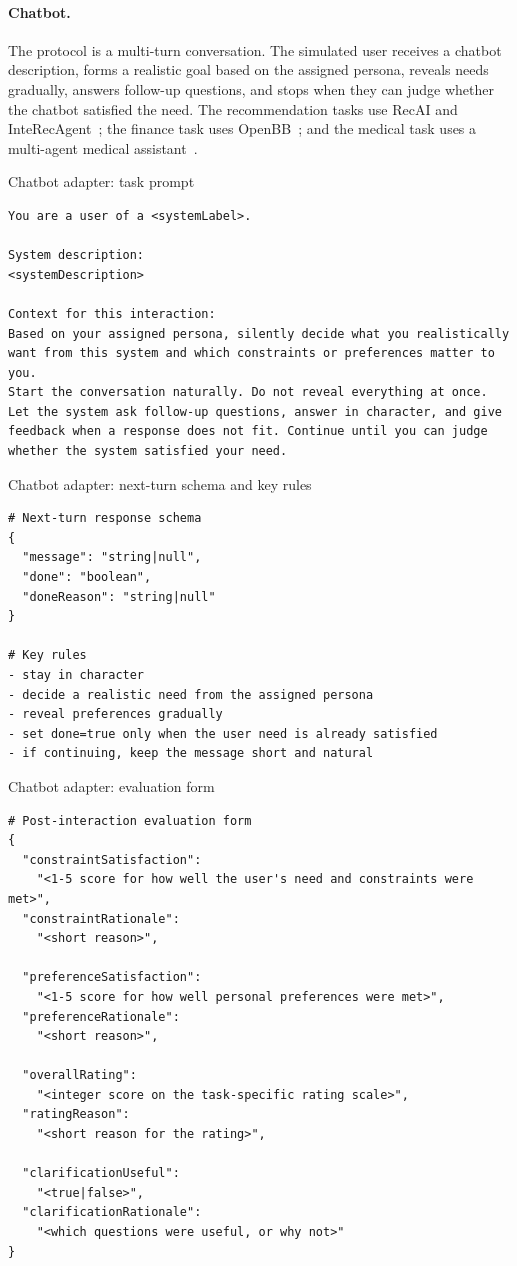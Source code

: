 \paragraph{Chatbot.}
The protocol is a multi-turn conversation. The simulated user receives a chatbot
description, forms a realistic goal based on the assigned persona, reveals needs
gradually, answers follow-up questions, and stops when they can judge whether the
chatbot satisfied the need. The recommendation tasks
use RecAI and InteRecAgent~\citep{huang2023recommender,lian2024recai}; the
finance task uses OpenBB~\citep{openbb,openbbmcp}; and the medical task uses a
multi-agent medical assistant~\citep{majumder2025medicalassistant}.

\begin{promptbox}[label={box:chat-task}]{Chatbot adapter: task prompt}
\begin{lstlisting}
You are a user of a <systemLabel>.

System description:
<systemDescription>

Context for this interaction:
Based on your assigned persona, silently decide what you realistically
want from this system and which constraints or preferences matter to you.
Start the conversation naturally. Do not reveal everything at once.
Let the system ask follow-up questions, answer in character, and give
feedback when a response does not fit. Continue until you can judge
whether the system satisfied your need.
\end{lstlisting}
\end{promptbox}

\begin{promptbox}[label={box:chat-schema}]{Chatbot adapter: next-turn schema and key rules}
\begin{lstlisting}
# Next-turn response schema
{
  "message": "string|null",
  "done": "boolean",
  "doneReason": "string|null"
}

# Key rules
- stay in character
- decide a realistic need from the assigned persona
- reveal preferences gradually
- set done=true only when the user need is already satisfied
- if continuing, keep the message short and natural
\end{lstlisting}
\end{promptbox}

\begin{promptbox}[label={box:chat-eval}]{Chatbot adapter: evaluation form}
\begin{lstlisting}
# Post-interaction evaluation form
{
  "constraintSatisfaction":
    "<1-5 score for how well the user's need and constraints were met>",
  "constraintRationale":
    "<short reason>",

  "preferenceSatisfaction":
    "<1-5 score for how well personal preferences were met>",
  "preferenceRationale":
    "<short reason>",

  "overallRating":
    "<integer score on the task-specific rating scale>",
  "ratingReason":
    "<short reason for the rating>",

  "clarificationUseful":
    "<true|false>",
  "clarificationRationale":
    "<which questions were useful, or why not>"
}
\end{lstlisting}
\end{promptbox}


